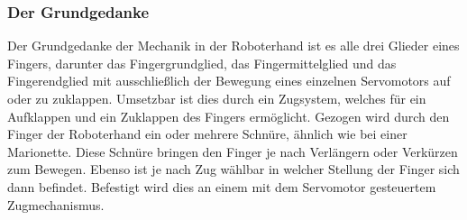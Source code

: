 \documentclass[titlepage,12pt,twoside]{article}
\begin{document}
\subsubsection{Der Grundgedanke}
Der Grundgedanke der Mechanik in der Roboterhand ist es alle drei Glieder eines Fingers,
darunter das Fingergrundglied, das Fingermittelglied und das Fingerendglied mit 
ausschließlich der Bewegung eines einzelnen Servomotors auf oder zu zuklappen. 
Umsetzbar ist dies durch ein Zugsystem, welches für ein Aufklappen und ein Zuklappen 
des Fingers ermöglicht. Gezogen wird durch den Finger der Roboterhand ein oder mehrere 
Schnüre, ähnlich wie bei einer Marionette. Diese Schnüre bringen den Finger je nach 
Verlängern oder Verkürzen zum Bewegen. Ebenso ist je nach Zug wählbar in welcher 
Stellung der Finger sich dann befindet. Befestigt wird dies an einem mit dem Servomotor 
gesteuertem Zugmechanismus. \\
\end{document}
